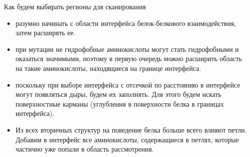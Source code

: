 \documentclass[12pt, xcolor={dvipsnames}]{beamer}
\begin{document}
\begin{frame}{Как будем выбирать регионы для сканирования}
\begin{itemize}
\item разумно начинать с области интерфейса белок-белкового взаимодействия, затем расширять ее.
\item при мутации не гидрофобные аминокислоты могут стать гидрофобными и оказаться значимыми, поэтому в первую очередь можно расширить область на такие аминокислоты, находящиеся на границе интерфейса.
\item поскольку при выборе интерфейса с отсечкой по расстоянию в интерфейсе могут появляться дыры, будем их заполнять. Для этого будем искать поверхностные карманы (углубления в поверхности белка в границах интерфейса).
\item Из всех вторичных структур на поведение белка больше всего влияют петли. Добавим в интерфейс все аминокислоты, содержащиеся в петлях, которые частично уже попали в область рассмотрения.
\end{itemize}
\end{frame}
\end{document}
